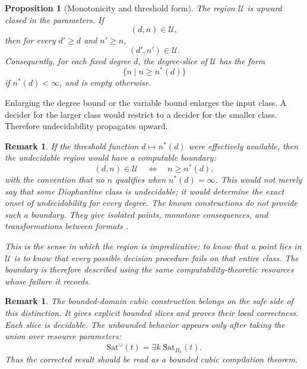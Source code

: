 \documentclass[letterpaper,10pt]{article}
\makeatletter
\theoremstyle{upright}
\theoremstyle{upright}
\newtheorem{remark}[theorem]{Remark}
\newtheorem{proposition}[theorem]{Proposition}
\renewenvironment{proof}[1][Proof]{%
	\par\pushQED{\qed}%
	\normalfont
	\topsep6\p@\@plus6\p@\relax
	\trivlist
	\item[\hskip\labelsep\slshape #1\@addpunct{.}]%
}{%
	\popQED\endtrivlist\@endpefalse
}
\makeatother
\begin{document}
\begin{proposition}[Monotonicity and threshold form]
\label{prop:region-monotonicity}
	The region $\mathcal{U}$ is upward closed in the parameters. If
	\begin{equation}
		(d,n)\in\mathcal{U},
	\end{equation}
	then for every $d'\ge d$ and $n'\ge n$,
	\begin{equation}
		(d',n')\in\mathcal{U}.
	\end{equation}
	Consequently, for each fixed degree $d$, the degree-slice of
	$\mathcal{U}$ has the form
	\begin{equation}
		\{n\mid n\ge n^*(d)\}
	\end{equation}
	if $n^*(d)<\infty$, and is empty otherwise.
\end{proposition}

\begin{proof}
	Enlarging the degree bound or the variable bound enlarges the input class. A decider for the larger class would restrict to a decider for the smaller class. Therefore undecidability propagates upward.
\end{proof}

\begin{remark}
\label{rem:boundary-obstruction}
	If the threshold function $d\mapsto n^*(d)$ were effectively available, then the undecidable region would have a computable boundary:
	\begin{equation}
		(d,n)\in\mathcal{U}
		\quad\Longleftrightarrow\quad
		n\ge n^*(d),
	\end{equation}
	with the convention that no $n$ qualifies when $n^*(d)=\infty$. This would not merely say that some Diophantine class is undecidable; it would determine the exact onset of undecidability for every degree. The known constructions do not provide such a boundary. They give isolated points, monotone consequences, and transformations between formats \citep{gasarch21,jones80}.

	This is the sense in which the region is impredicative: to know that a point lies in $\mathcal{U}$ is to know that every possible decision procedure fails on that entire class. The boundary is therefore described using the same computability-theoretic resources whose failure it records.
\end{remark}

\begin{remark}
\label{rem:region-relation-corrected}
	The bounded-domain cubic construction belongs on the safe side of this distinction. It gives explicit bounded slices and proves their local correctness. Each slice is decidable. The unbounded behavior appears only after taking the union over resource parameters:
	\begin{equation}
		\mathrm{Sat}^{\cup}(t)
		=
		\exists k\;\mathrm{Sat}_{B_k}(t).
	\end{equation}
	Thus the corrected result should be read as a bounded cubic compilation theorem.
\end{remark}
\end{document}
